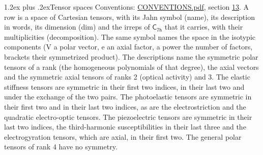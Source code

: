 \documentclass[10pt,a4paper]{article}
\makeatletter
\renewcommand\section{\@startsection{section}{1}{\z@}{-3ex plus -1ex minus -.2ex}%
  {1.2ex plus .2ex}{\normalfont\large\sffamily\bfseries\color{parttitle}}}
\numberwithin{equation}{section}
\newcommand{\grp}[1]{\mathsf{#1}}
\makeatother
\begin{document}
\section{Tensor spaces}\label{s:tensor_spaces}
Conventions: \href{../../CONVENTIONS.pdf}{CONVENTIONS.pdf}, section \href{../../CONVENTIONS.pdf\#conv.13}{13}.
\leavevmode\label{n:head.name}\label{n:head.description}\label{n:head.dim}\label{n:head.decomposition}A row is a space of Cartesian tensors, with its Jahn symbol (name), its description in words, its dimension (dim) and the irreps of $\grp{C_{7h}}$ that it carries, with their multiplicities (decomposition). \label{n:label.jahn}The same symbol names the space in the isotypic components (V a polar vector, e an axial factor, a power the number of factors, brackets their symmetrized product). The descriptions name the symmetric polar tensors of a rank (the homogeneous polynomials of that degree), the axial vectors and the symmetric axial tensors of ranks 2 (optical activity) and 3. The elastic stiffness tensors are symmetric in their first two indices, in their last two and under the exchange of the two pairs. The photoelastic tensors are symmetric in their first two and in their last two indices, as are the electrostriction and the quadratic electro-optic tensors. The piezoelectric tensors are symmetric in their last two indices, the third-harmonic susceptibilities in their last three and the electrogyration tensors, which are axial, in their first two. The general polar tensors of rank 4 have no symmetry.
\end{document}
